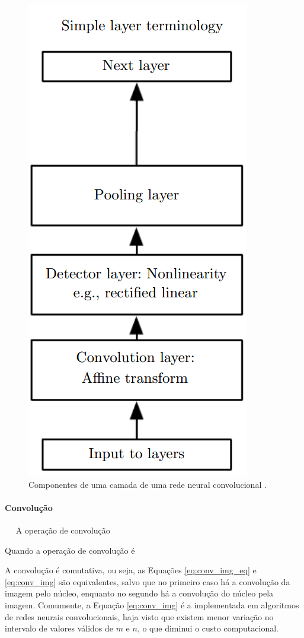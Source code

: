 \begin{figure}
	\centering
	\caption{Componentes de uma camada de uma rede neural convolucional \cite{goodfellow2016deep}.}
	\label{fig:cnn_camada}
	\includegraphics[height=0.3\textheight]{img/cnn_camada.png}
\end{figure}


\paragraph{Convolução}
\ \ \newline
A operação de convolução

Quando a operação de convolução é

A convolução é comutativa, ou seja, as Equações \ref{eq:conv_img_eq} e \ref{eq:conv_img} são equivalentes, salvo que no primeiro caso há a convolução da imagem pelo núcleo, enquanto no segundo há a convolução do núcleo pela imagem. Comumente, a Equação \ref{eq:conv_img} é a implementada em algoritmos de redes neurais convolucionais, haja visto que existem menor variação no intervalo de valores válidos de $m$ e $n$, o que diminui o custo computacional.

